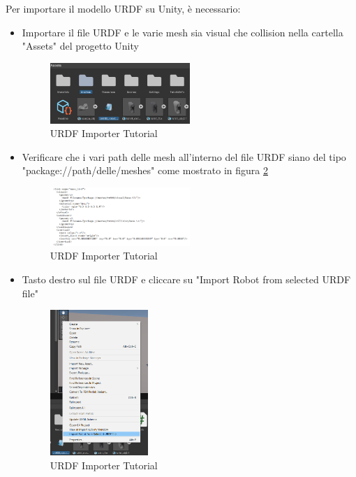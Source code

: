 \documentclass[11pt]{report}
\begin{document}
Per importare il modello URDF su Unity, è necessario:
\begin{itemize}
    \item Importare il file URDF e le varie mesh sia visual che collision nella cartella "Assets" del progetto Unity
    \begin{figure}[H]
        \centering
        \includegraphics[width=0.5\textwidth]{images/URDF_Importer_4.png}
        \caption{URDF Importer Tutorial}
        \label{fig:URDF_Importer_4}
    \end{figure}
    \item Verificare che i vari path delle mesh all'interno del file URDF siano del tipo "package://path/delle/meshes" come mostrato in figura \ref{fig:URDF_Importer_5}
    \begin{figure}[H]
        \centering
        \includegraphics[width=0.5\textwidth]{images/URDF_Importer_5.png}
        \caption{URDF Importer Tutorial}
        \label{fig:URDF_Importer_5}
    \end{figure}
    \item Tasto destro sul file URDF e cliccare su "Import Robot from selected URDF file"
    \begin{figure}[H]
        \centering
        \includegraphics[width=0.35\textwidth]{images/URDF_Importer_6.png}
        \caption{URDF Importer Tutorial}
        \label{fig:URDF_Importer_6}
    \end{figure}
\end{itemize}
\end{document}
